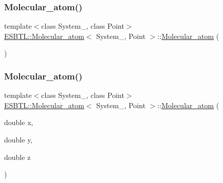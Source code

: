 \mbox{\label{classESBTL_1_1Molecular__atom_a628dcff0a6307d4e49bb8a295ad2bd9f}} 
\subsubsection{\texorpdfstring{Molecular\+\_\+atom()}{Molecular\_atom()}\hspace{0.1cm}{\footnotesize\ttfamily [2/3]}}
{\footnotesize\ttfamily template$<$class System\+\_\+, class Point$>$ \\
\hyperlink{classESBTL_1_1Molecular__atom}{E\+S\+B\+T\+L\+::\+Molecular\+\_\+atom}$<$ System\+\_\+, Point $>$\+::\hyperlink{classESBTL_1_1Molecular__atom}{Molecular\+\_\+atom} (\begin{DoxyParamCaption}{ }\end{DoxyParamCaption})\hspace{0.3cm}{\ttfamily [inline]}}

\mbox{\label{classESBTL_1_1Molecular__atom_a5ce88fe393e6b78ac28de314a458461b}} 
\subsubsection{\texorpdfstring{Molecular\+\_\+atom()}{Molecular\_atom()}\hspace{0.1cm}{\footnotesize\ttfamily [3/3]}}
{\footnotesize\ttfamily template$<$class System\+\_\+, class Point$>$ \\
\hyperlink{classESBTL_1_1Molecular__atom}{E\+S\+B\+T\+L\+::\+Molecular\+\_\+atom}$<$ System\+\_\+, Point $>$\+::\hyperlink{classESBTL_1_1Molecular__atom}{Molecular\+\_\+atom} (\begin{DoxyParamCaption}\item[{double}]{x,  }\item[{double}]{y,  }\item[{double}]{z }\end{DoxyParamCaption})\hspace{0.3cm}{\ttfamily [inline]}}



